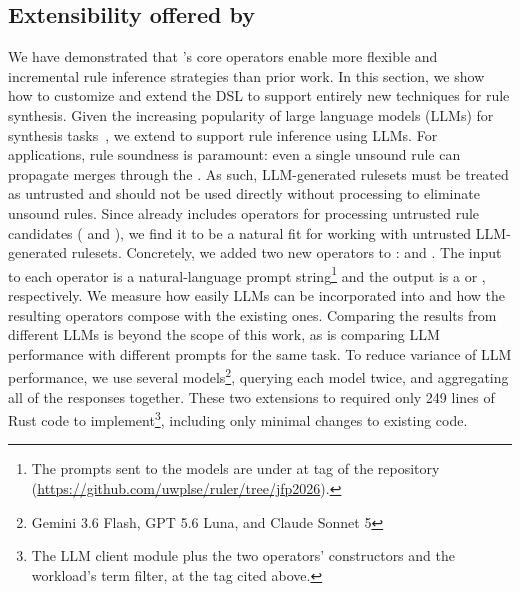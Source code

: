 \subsection{Extensibility offered by \enumo}
\label{sec:case-study-llm}
We have demonstrated that \enumo's core operators enable more
  flexible and incremental rule inference strategies than prior work.
In this section, we show how to customize and extend the \enumo DSL to
  support entirely new techniques for rule synthesis.
Given the increasing popularity of large language models (LLMs) for synthesis
  tasks~\citep{hysynth,asap,shraddha,paper1,paper2,paper3,paper4},
  we extend \enumo to support rule inference using LLMs.
For \eqsat applications, rule soundness is paramount: even a single
  unsound rule can propagate merges through the \egraph.
As such, LLM-generated rulesets must be treated as untrusted and
  should not be used directly without processing to eliminate unsound rules.
Since \enumo already includes operators for processing untrusted rule candidates
  ( and ), we find it to be a natural fit for
  working with untrusted LLM-generated rulesets.
Concretely, we added two new operators to \enumo{}:  and
  .
The input to each operator is a natural-language prompt string\footnote{
  The prompts sent to the models are under  at tag
   of the repository
  (\url{https://github.com/uwplse/ruler/tree/jfp2026}).
}
  and the output is a  or , respectively.
We measure how easily LLMs can be incorporated into \enumo and how the
  resulting operators compose with the existing ones.
Comparing the results from different LLMs is beyond the scope of this work,
  as is comparing LLM performance with different prompts for the same task.
To reduce variance of LLM performance, we use several models\footnote{
  Gemini 3.6 Flash, GPT 5.6 Luna, and Claude Sonnet 5}, querying
  each model twice, and aggregating all of the responses together.
These two extensions to \enumo required only 249 lines of Rust
  code to implement\footnote{The LLM client module plus the two
  operators' constructors and the workload's term filter, at the
  tag cited above.}, including only minimal changes to existing
  code.

